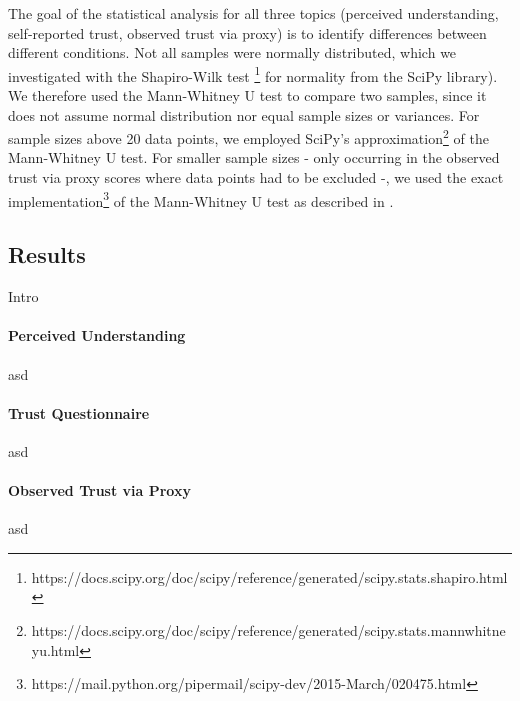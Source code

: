 The goal of the statistical analysis for all three topics (perceived understanding, self-reported trust, observed trust via proxy) is to identify differences between different conditions. Not all samples were normally distributed, which we investigated with the Shapiro-Wilk test \footnote{https://docs.scipy.org/doc/scipy/reference/generated/scipy.stats.shapiro.html} for normality from the SciPy library). We therefore used the Mann-Whitney U test to compare two samples, since it does not assume normal distribution nor equal sample sizes or variances. For sample sizes above 20 data points, we employed SciPy's approximation\footnote{https://docs.scipy.org/doc/scipy/reference/generated/scipy.stats.mannwhitneyu.html} of the Mann-Whitney U test. For smaller sample sizes - only occurring in the observed trust via proxy scores where data points had to be excluded -, we used the exact implementation\footnote{https://mail.python.org/pipermail/scipy-dev/2015-March/020475.html} of the Mann-Whitney U test as described in \cite{cheung1997mann}.


\subsection{Results}
Intro \newline

\paragraph{Perceived Understanding}
asd


\paragraph{Trust Questionnaire}
asd


\paragraph{Observed Trust via Proxy}
asd



